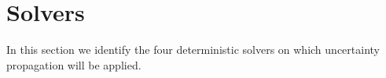 \section{Solvers}
In this section we identify the four deterministic solvers on which uncertainty propagation will be applied.

\subsection{}
